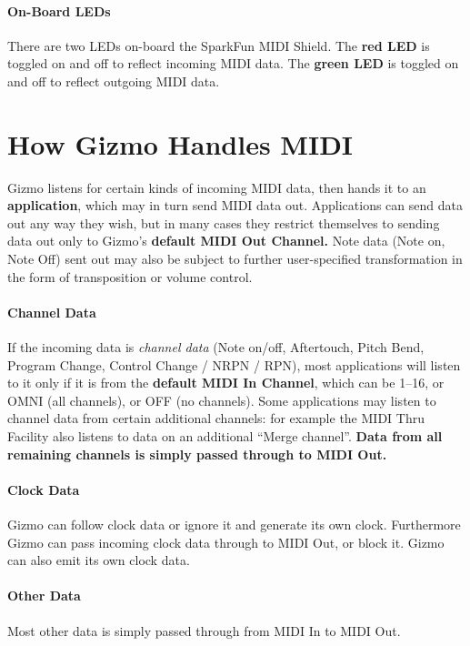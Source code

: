 \documentclass{article}
\begin{document}
\paragraph{On-Board LEDs}

There are two LEDs on-board the SparkFun MIDI Shield.  The {\bf red LED} is toggled on and off to reflect incoming MIDI data.  The {\bf green LED} is toggled on and off to reflect outgoing MIDI data.  

\clearpage
\section{How Gizmo Handles MIDI}

Gizmo listens for certain kinds of incoming MIDI data, then hands it to an {\bf application}, which may in turn send MIDI data out.  Applications can send data out any way they wish, but in many cases they restrict themselves to sending data out only to Gizmo's {\bf default MIDI Out Channel.}  Note data (Note on, Note Off) sent out may also be subject to further user-specified transformation in the form of transposition or volume control.  

\vspace{-0.5em}\paragraph{Channel Data} If the incoming data is {\it channel data} (Note on/off, Aftertouch, Pitch Bend, Program Change, Control Change / NRPN / RPN), most applications will listen to it only if it is from the {\bf default MIDI In Channel}, which can be 1--16, or OMNI (all channels), or OFF (no channels).  Some applications may listen to channel data from certain additional channels: for example the MIDI Thru Facility also listens to data on an additional ``Merge channel''.  {\bf Data from all remaining channels is simply passed through to MIDI Out. }  

\vspace{-0.5em}\paragraph{Clock Data} Gizmo can follow clock data or ignore it and generate its own clock.  Furthermore Gizmo can pass incoming clock data through to MIDI Out, or block it.  Gizmo can also emit its own clock data.

\vspace{-0.5em}\paragraph{Other Data} Most other data is simply passed through from MIDI In to MIDI Out.
\end{document}
